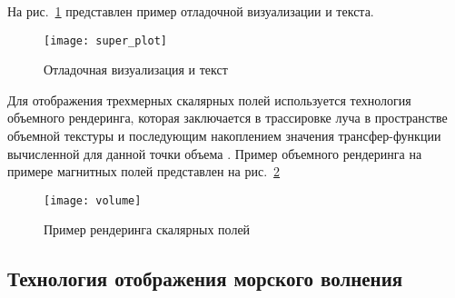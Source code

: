 На рис.~\ref{super_plot} представлен пример отладочной визуализации и текста.

\begin{figure}[ht]
\begin{center}
\texttt{[image: super\_plot]}
\end{center}
\caption{Отладочная визуализация и текст}
\label{super_plot}
\end{figure}

Для отображения трехмерных скалярных полей используется технология объемного рендеринга, которая 
заключается в трассировке луча в пространстве объемной текстуры и последующим накоплением 
значения трансфер-функции вычисленной для данной точки объема \citep{Engel01high-qualitypre-integrated}.
Пример объемного рендеринга на примере магнитных полей представлен на рис.~\ref{volume}

\begin{figure}[ht]
\begin{center}
\texttt{[image: volume]}
\end{center}
\caption{Пример рендеринга скалярных полей}
\label{volume}
\end{figure}


\subsection{Технология отображения морского волнения}

